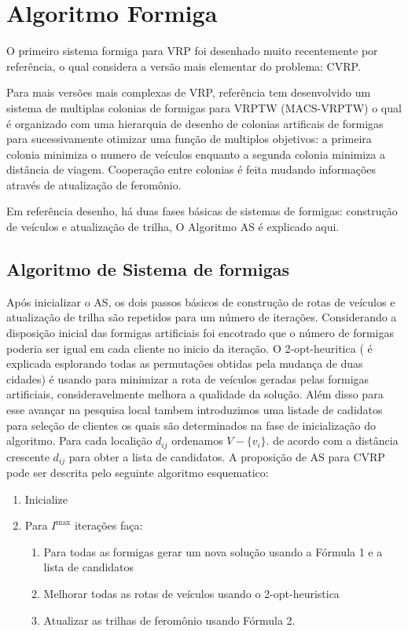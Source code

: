 \section{Algoritmo Formiga}

 O primeiro sistema formiga para VRP foi desenhado muito recentemente por {\color{red} referência},
o qual considera a versão mais elementar do problema: CVRP.

 Para mais versões mais complexas de VRP, {\color{red} referência} tem desenvolvido um sistema de
multiplas colonias de formigas para VRPTW (MACS-VRPTW) o qual é organizado com uma hierarquia de
desenho de colonias artificais de formigas para sucessivamente otimizar uma função de multiplos
objetivos: a primeira colonia minimiza o numero de veículos enquanto a segunda colonia minimiza a
distância de viagem. Cooperação entre colonias é feita mudando informações através de atualização de
feromônio.

 Em {\color{red} referência} desenho, há duas fases básicas de sistemas de formigas: construção de
veículos e atualização de trilha, O Algoritmo AS é explicado aqui.

\subsection{ Algoritmo de Sistema de formigas}

 Após inicializar o AS, os dois passos básicos de construção de rotas de veículos e atualização de
trilha são repetidos para um número de iterações. Considerando a disposição inicial das formigas
artificiais foi encotrado que o número de formigas poderia ser igual em cada cliente no inicio da
iteração. O 2-opt-heuritica ( é explicada esplorando todas as permutações obtidas pela mudança de
duas cidades) é usando para minimizar a rota de veículos geradas pelas formigas artificiais,
consideravelmente melhora a qualidade da solução. Além disso para esse avançar na pesquisa local
tambem introduzimos uma listade de cadidatos para seleção de clientes os quais são determinados na
fase de inicialização do algoritmo. Para cada localição $d_{ij}$ ordenamos $V-\{v_i\}$. de acordo
com a distância crescente $d_{ij}$ para obter a lista de candidatos. A proposição de AS para CVRP
pode ser descrita pelo seguinte algoritmo esquematico:

\begin{enumerate}
\item Inicialize
\item Para $I^{\max}$ iterações faça:

\begin{enumerate}
\item Para todas as formigas gerar um nova solução usando a Fórmula 1 e a lista de candidatos
\item Melhorar todas as rotas de veículos usando o 2-opt-heuristica
\item Atualizar as trilhas de feromônio usando Fórmula 2.
\end{enumerate}
\end{enumerate}

